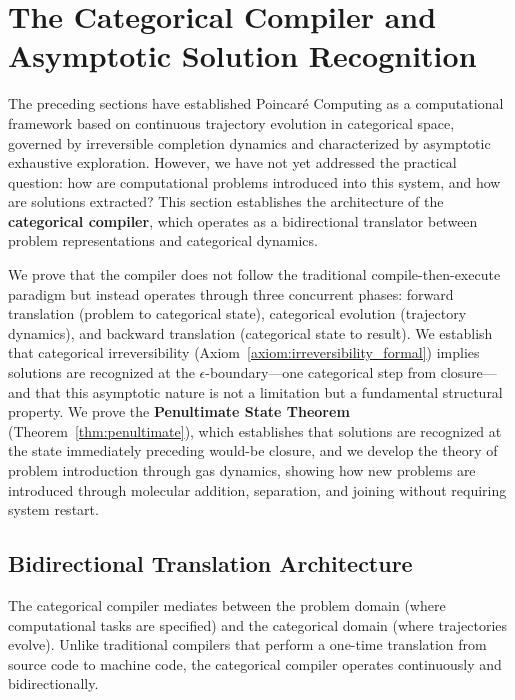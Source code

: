 \section{The Categorical Compiler and Asymptotic Solution Recognition}
\label{sec:compiler}

The preceding sections have established Poincaré Computing as a computational framework based on continuous trajectory evolution in categorical space, governed by irreversible completion dynamics and characterized by asymptotic exhaustive exploration. However, we have not yet addressed the practical question: how are computational problems introduced into this system, and how are solutions extracted? This section establishes the architecture of the \textbf{categorical compiler}, which operates as a bidirectional translator between problem representations and categorical dynamics.

We prove that the compiler does not follow the traditional compile-then-execute paradigm but instead operates through three concurrent phases: forward translation (problem to categorical state), categorical evolution (trajectory dynamics), and backward translation (categorical state to result). We establish that categorical irreversibility (Axiom~\ref{axiom:irreversibility_formal}) implies solutions are recognized at the $\epsilon$-boundary---one categorical step from closure---and that this asymptotic nature is not a limitation but a fundamental structural property. We prove the \textbf{Penultimate State Theorem} (Theorem~\ref{thm:penultimate}), which establishes that solutions are recognized at the state immediately preceding would-be closure, and we develop the theory of problem introduction through gas dynamics, showing how new problems are introduced through molecular addition, separation, and joining without requiring system restart.

\subsection{Bidirectional Translation Architecture}

The categorical compiler mediates between the problem domain (where computational tasks are specified) and the categorical domain (where trajectories evolve). Unlike traditional compilers that perform a one-time translation from source code to machine code, the categorical compiler operates continuously and bidirectionally.

